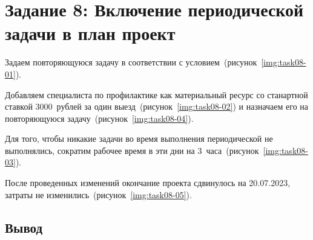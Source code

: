 \section{Задание 8: Включение периодической задачи в план проект}

Задаем повторяющуюся задачу в соответствии с условием~(рисунок~\ref{img:task08-01}).


Добавляем специалиста по профилактике как материальный ресурс со станартной
ставкой 3000~рублей за один выезд~(рисунок~\ref{img:task08-02}) и назначаем его
на повторяющуюся задачу~(рисунок~\ref{img:task08-04}).



Для того, чтобы никакие задачи во время выполнения периодической не
выполнялись, сократим рабочее время в эти дни на
3~часа~(рисунок~\ref{img:task08-03}).


После проведенных изменений окончание проекта сдвинулось на 20.07.2023, затраты
не изменились~(рисунок~\ref{img:task08-05}).


\subsection*{Вывод}


